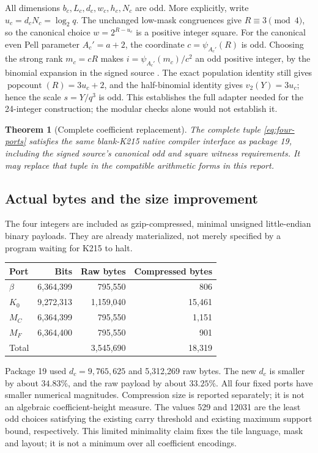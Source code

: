\documentclass[11pt,letterpaper]{article}
\newtheorem{theorem}{Theorem}[section]
\theoremstyle{remark}
\begin{document}
All dimensions $b_c,L_c,d_c,w_c,h_c,N_c$ are odd.  More explicitly, write
$u_c=d_cN_c=\log_2q$.  The unchanged low-mask congruences give
$R\equiv3\pmod4$, so the canonical choice $w=2^{R-u_c}$ is a positive
integer square.  For the canonical even Pell parameter $A_c'=a+2$,
the coordinate $c=\psi_{A_c'}(R)$ is odd.  Choosing the strong rank
$m_c=cR$ makes $i=\psi_{A_c'}(m_c)/c^2$ an odd positive integer, by
the binomial expansion in the signed source \cite{normalized,oddscale}.
The exact population identity still gives
$\operatorname{popcount}(R)=3u_c+2$, and the half-binomial identity gives
$v_2(Y)=3u_c$; hence the scale $s=Y/q^3$ is odd.
This establishes the full adapter needed for the 24-integer construction;
the modular checks alone would not establish it.

\begin{theorem}[Complete coefficient replacement]\label{thm:coefficients}
The complete tuple \eqref{eq:four-ports} satisfies the same blank-K215
native compiler interface as package 19, including the signed source's
canonical odd and square witness requirements.  It may replace that
tuple in the compatible arithmetic forms in this report.
\end{theorem}

\subsection{Actual bytes and the size improvement}

The four integers are included as gzip-compressed, minimal unsigned
little-endian binary payloads.  They are already materialized, not merely
specified by a program waiting for K215 to halt.
\begin{center}
\begin{tabular}{lrrr}
\toprule
Port & Bits & Raw bytes & Compressed bytes\\
\midrule
$\beta$ & 6,364,399 & 795,550 & 806\\
$K_0$ & 9,272,313 & 1,159,040 & 15,461\\
$M_C$ & 6,364,399 & 795,550 & 1,151\\
$M_F$ & 6,364,400 & 795,550 & 901\\
\midrule
Total & & 3,545,690 & 18,319\\
\bottomrule
\end{tabular}
\end{center}
Package 19 used $d_c=9,765,625$ and 5,312,269 raw bytes.  The new $d_c$
is smaller by about $34.83\%$, and the raw payload by about $33.25\%$.
All four fixed ports have smaller numerical magnitudes.  Compression size
is reported separately; it is not an algebraic coefficient-height measure.
The values 529 and 12031 are the least odd choices satisfying the existing
carry threshold and existing maximum support bound, respectively.  This
limited minimality claim fixes the tile language, mask and layout; it is
not a minimum over all coefficient encodings.
\end{document}
